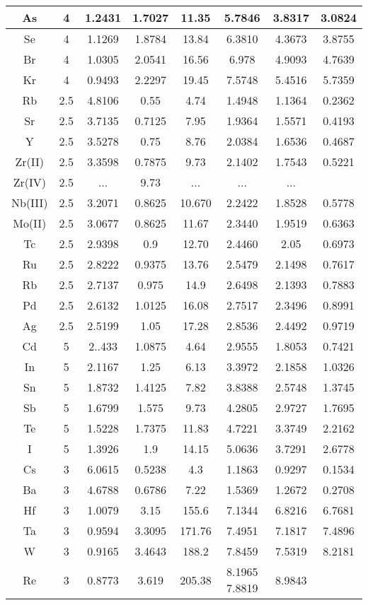 \documentclass[journal]{IEEEtran}
\begin{document}
\begin{longtable}{|c|c|c|c|c|c|c|c|}
		\hline
		As & 4 & 1.2431 & 1.7027 & 11.35 & 5.7846 & 3.8317 & 3.0824 \\
		\hline
		Se & 4 & 1.1269 & 1.8784 & 13.84 & 6.3810 & 4.3673 & 3.8755 \\
		\hline
		Br & 4 & 1.0305 & 2.0541 & 16.56 & 6.978 & 4.9093 & 4.7639 \\
		\hline
		Kr & 4 & 0.9493 & 2.2297 & 19.45 & 7.5748 &5.4516 & 5.7359 \\
		\hline
		Rb & 2.5 & 4.8106 & 0.55 & 4.74 & 1.4948 & 1.1364 & 0.2362 \\
		\hline
		Sr & 2.5 & 3.7135 & 0.7125 & 7.95 & 1.9364 & 1.5571 & 0.4193 \\
		\hline
		Y & 2.5 & 3.5278 & 0.75 & 8.76 & 2.0384 & 1.6536 & 0.4687 \\
		\hline
		Zr(II) & 2.5 & 3.3598 & 0.7875 & 9.73 & 2.1402 & 1.7543 & 0.5221 \\
		\hline
		Zr(IV) & 2.5 & ... & 9.73 & ... & ... & ... \\
		\hline
		Nb(III) & 2.5 & 3.2071 & 0.8625 & 10.670 & 2.2422 & 1.8528 & 0.5778 \\
		\hline
		Mo(II) & 2.5 & 3.0677 & 0.8625 & 11.67 & 2.3440 & 1.9519 & 0.6363 \\
		\hline
		Tc & 2.5 & 2.9398 & 0.9 & 12.70 & 2.4460 & 2.05 & 0.6973 \\
		\hline
		Ru & 2.5 & 2.8222 & 0.9375 & 13.76 & 2.5479 & 2.1498 & 0.7617 \\
		\hline
		Rb& 2.5 & 2.7137 & 0.975 & 14.9 & 2.6498 & 2.1393 & 0.7883 \\
		\hline
		Pd & 2.5 & 2.6132 & 1.0125 & 16.08 & 2.7517 & 2.3496 & 0.8991 \\
		\hline
		Ag & 2.5 & 2.5199 & 1.05 & 17.28 & 2.8536 & 2.4492 & 0.9719 \\
		\hline
		Cd & 5 & 2..433 & 1.0875 & 4.64 & 2.9555 & 1.8053 & 0.7421 \\
		\hline
		In & 5 & 2.1167 & 1.25  & 6.13 & 3.3972 & 2.1858 & 1.0326 \\
		\hline
		Sn & 5 & 1.8732 & 1.4125 & 7.82 & 3.8388 & 2.5748 & 1.3745  \\
		\hline
		Sb  & 5 & 1.6799 & 1.575 & 9.73 & 4.2805 & 2.9727 & 1.7695 \\
		\hline
		Te & 5 & 1.5228 & 1.7375 & 11.83 & 4.7221 & 3.3749 & 2.2162 \\
		\hline
		I & 5 & 1.3926 & 1.9 & 14.15 & 5.0636 & 3.7291 & 2.6778 \\
		\hline
		Cs & 3 & 6.0615 & 0.5238 & 4.3 & 1.1863 & 0.9297 & 0.1534 \\
		\hline
		Ba & 3 & 4.6788 & 0.6786 & 7.22 & 1.5369 & 1.2672 & 0.2708 \\
		\hline
		Hf & 3 & 1.0079 & 3.15 & 155.6 & 7.1344 & 6.8216 & 6.7681 \\
		\hline
		Ta & 3 & 0.9594 & 3.3095 & 171.76 & 7.4951 & 7.1817 & 7.4896 \\
		\hline
		W & 3 & 0.9165 & 3.4643 & 188.2 & 7.8459 & 7.5319 & 8.2181 \\
		\hline
		Re & 3 &  0.8773 & 3.619 & 205.38 & 8.1965 7.8819 & 8.9843 \\
		\hline
		

\end{longtable}
\end{document}

